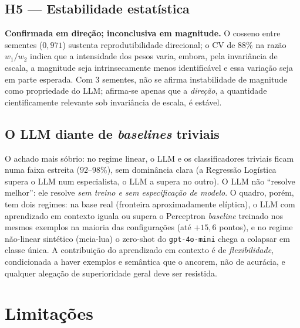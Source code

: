 \documentclass[12pt,a4paper]{article}
\begin{document}
\subsection{H5 — Estabilidade estatística}
\textbf{Confirmada em direção; inconclusiva em magnitude.} O cosseno entre sementes
($0{,}971$) sustenta reprodutibilidade direcional; o CV de $88\%$ na razão $w_1/w_2$ indica
que a intensidade dos pesos varia, embora, pela invariância de escala, a magnitude seja
intrinsecamente menos identificável e essa variação seja em parte esperada. Com $3$ sementes,
não se afirma instabilidade de magnitude como propriedade do LLM; afirma-se apenas que a
\emph{direção}, a quantidade cientificamente relevante sob invariância de escala, é estável.

\subsection{O LLM diante de \emph{baselines} triviais}
O achado mais sóbrio: no regime linear, o LLM e os classificadores triviais ficam numa
faixa estreita ($92$–$98\%$), sem dominância clara (a Regressão Logística supera o LLM num
especialista, o LLM a supera no outro). O LLM não ``resolve melhor'': ele resolve \emph{sem
treino e sem especificação de modelo}. O quadro, porém, tem dois regimes: na base real
(fronteira aproximadamente elíptica), o LLM com aprendizado em contexto iguala ou supera o Perceptron
\emph{baseline} treinado nos mesmos exemplos na maioria das configurações (até $+15{,}6$
pontos), e no regime não-linear sintético (meia-lua) o zero-shot do \texttt{gpt-4o-mini}
chega a colapsar em classe única. A contribuição do aprendizado em contexto é de
\emph{flexibilidade},
condicionada a haver exemplos e semântica que o ancorem, não de acurácia, e qualquer
alegação de superioridade geral deve ser resistida.

\section{Limitações}
\label{sec:limitacoes}
\end{document}
